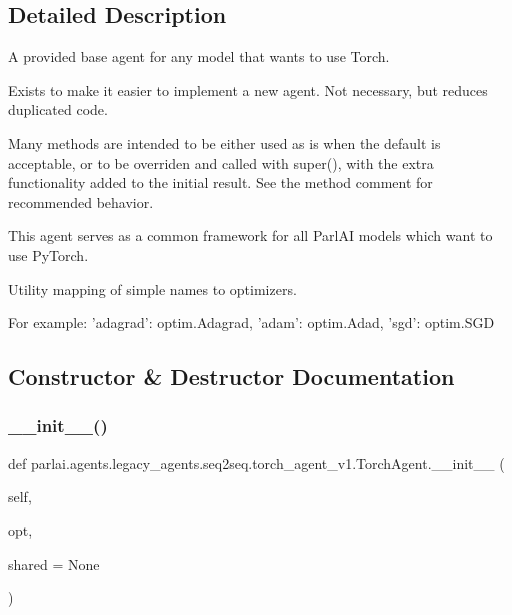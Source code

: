 \subsection{Detailed Description}
\begin{DoxyVerb}A provided base agent for any model that wants to use Torch.

Exists to make it easier to implement a new agent.
Not necessary, but reduces duplicated code.

Many methods are intended to be either used as is when the default is
acceptable, or to be overriden and called with super(), with the extra
functionality added to the initial result. See the method comment for
recommended behavior.

This agent serves as a common framework for all ParlAI models which want
to use PyTorch.
\end{DoxyVerb}
\begin{DoxyVerb}Utility mapping of simple names to optimizers.

For example:
'adagrad': optim.Adagrad, 'adam': optim.Adad, 'sgd': optim.SGD
\end{DoxyVerb}
 

\subsection{Constructor \& Destructor Documentation}
\mbox{\label{classparlai_1_1agents_1_1legacy__agents_1_1seq2seq_1_1torch__agent__v1_1_1TorchAgent_a1c4eb91757ee23e75edfa957d05db338}} 
\subsubsection{\texorpdfstring{\+\_\+\+\_\+init\+\_\+\+\_\+()}{\_\_init\_\_()}}
{\footnotesize\ttfamily def parlai.\+agents.\+legacy\+\_\+agents.\+seq2seq.\+torch\+\_\+agent\+\_\+v1.\+Torch\+Agent.\+\_\+\+\_\+init\+\_\+\+\_\+ (\begin{DoxyParamCaption}\item[{}]{self,  }\item[{}]{opt,  }\item[{}]{shared = {\ttfamily None} }\end{DoxyParamCaption})}

